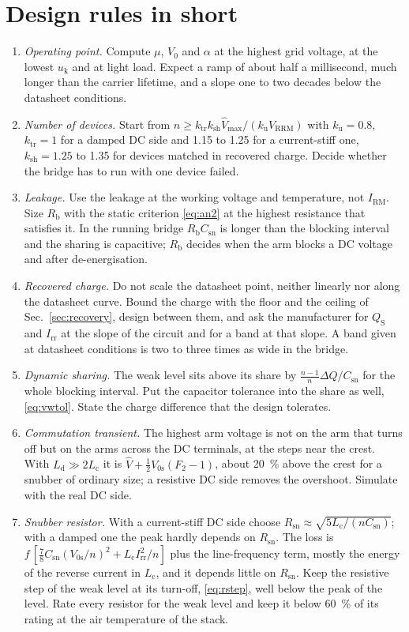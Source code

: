 \documentclass[10pt,a4paper]{scrartcl}
\newcommand{\Vrrm}{V_\mathrm{RRM}}
\newcommand{\Irm}{I_\mathrm{RM}}
\newcommand{\Irr}{I_\mathrm{rr}}
\newcommand{\Csn}{C_\mathrm{sn}}
\newcommand{\Rsn}{R_\mathrm{sn}}
\newcommand{\Rb}{R_\mathrm{b}}
\newcommand{\Lc}{L_\mathrm{c}}
\newcommand{\Ld}{L_\mathrm{d}}
\newcommand{\Vo}{V_0}
\newcommand{\Vos}{V_\mathrm{0s}}
\newcommand{\Vh}{\hat V}
\newcommand{\uk}{u_\mathrm{k}}
\newcommand{\ku}{k_\mathrm{u}}
\newcommand{\ktr}{k_\mathrm{tr}}
\newcommand{\ksh}{k_\mathrm{sh}}
\begin{document}
\section{Design rules in short}
\label{sec:rules}
\begin{enumerate}
\item \emph{Operating point.} Compute $\mu$, $\Vo$ and $\alpha$ at the highest grid voltage, at the lowest $\uk$ and at light load. Expect a ramp of about half a millisecond, much longer than the carrier lifetime, and a slope one to two decades below the datasheet conditions.
\item \emph{Number of devices.} Start from $n \ge \ktr\ksh\Vh_\mathrm{max}/(\ku\Vrrm)$ with $\ku = 0.8$, $\ktr = 1$ for a damped DC side and 1.15 to 1.25 for a current-stiff one, $\ksh = 1.25$ to 1.35 for devices matched in recovered charge. Decide whether the bridge has to run with one device failed.
\item \emph{Leakage.} Use the leakage at the working voltage and temperature, not $\Irm$. Size $\Rb$ with the static criterion \eqref{eq:an2} at the highest resistance that satisfies it. In the running bridge $\Rb\Csn$ is longer than the blocking interval and the sharing is capacitive; $\Rb$ decides when the arm blocks a DC voltage and after de-energisation.
\item \emph{Recovered charge.} Do not scale the datasheet point, neither linearly nor along the datasheet curve. Bound the charge with the floor and the ceiling of Sec.~\ref{sec:recovery}, design between them, and ask the manufacturer for $Q_\mathrm{S}$ and $\Irr$ at the slope of the circuit and for a band at that slope. A band given at datasheet conditions is two to three times as wide in the bridge.
\item \emph{Dynamic sharing.} The weak level sits above its share by $\tfrac{n-1}{n}\Delta Q/\Csn$ for the whole blocking interval. Put the capacitor tolerance into the share as well, \eqref{eq:vwtol}. State the charge difference that the design tolerates.
\item \emph{Commutation transient.} The highest arm voltage is not on the arm that turns off but on the arms across the DC terminals, at the steps near the crest. With $\Ld \gg 2\Lc$ it is $\Vh + \tfrac12\Vos(F_2 - 1)$, about \SI{20}{\percent} above the crest for a snubber of ordinary size; a resistive DC side removes the overshoot. Simulate with the real DC side.
\item \emph{Snubber resistor.} With a current-stiff DC side choose $\Rsn \approx \sqrt{5\Lc/(n\Csn)}$; with a damped one the peak hardly depends on $\Rsn$. The loss is $f\,[\tfrac78\Csn(\Vos/n)^2 + \Lc\Irr^2/n]$ plus the line-frequency term, mostly the energy of the reverse current in $\Lc$, and it depends little on $\Rsn$. Keep the resistive step of the weak level at its turn-off, \eqref{eq:rstep}, well below the peak of the level. Rate every resistor for the weak level and keep it below \SI{60}{\percent} of its rating at the air temperature of the stack.

\end{enumerate}
\end{document}
